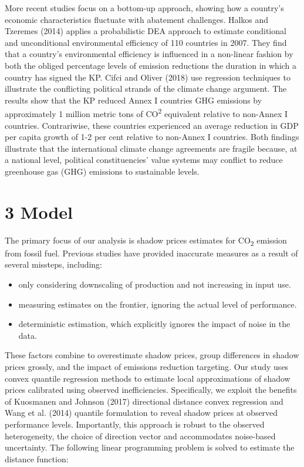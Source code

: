 \documentclass[
  10pt,
]{article}
\providecommand{\tightlist}{%
  \setlength{\itemsep}{0pt}\setlength{\parskip}{0pt}}
\begin{document}
More recent studies focus on a bottom-up approach, showing how a
country's economic characteristics fluctuate with abatement challenges.
Halkos and Tzeremes (2014) applies a probabilistic DEA approach to
estimate conditional and unconditional environmental efficiency of 110
countries in 2007. They find that a country's environmental efficiency
is influenced in a non-linear fashion by both the obliged percentage
levels of emission reductions the duration in which a country has signed
the KP. Cifci and Oliver (2018) use regression techniques to illustrate
the conflicting political strands of the climate change argument. The
results show that the KP reduced Annex I countries GHG emissions by
approximately 1 million metric tons of CO\textsuperscript{2} equivalent
relative to non-Annex I countries. Contrariwise, these countries
experienced an average reduction in GDP per capita growth of 1-2 per
cent relative to non-Annex I countries. Both findings illustrate that
the international climate change agreements are fragile because, at a
national level, political constituencies' value systems may conflict to
reduce greenhouse gas (GHG) emissions to sustainable levels.

\hypertarget{model}{%
\section{3 Model}\label{model}}

The primary focus of our analysis is shadow prices estimates for
CO\textsubscript{2} emission from fossil fuel. Previous studies have
provided inaccurate measures as a result of several missteps, including:

\begin{itemize}
\tightlist
\item
  only considering downscaling of production and not increasing in input
  use.
\item
  measuring estimates on the frontier, ignoring the actual level of
  performance.
\item
  deterministic estimation, which explicitly ignores the impact of noise
  in the data.
\end{itemize}

These factors combine to overestimate shadow prices, group differences
in shadow prices grossly, and the impact of emissions reduction
targeting. Our study uses convex quantile regression methods to estimate
local approximations of shadow prices calibrated using observed
inefficiencies. Specifically, we exploit the benefits of Kuosmanen and
Johnson (2017) directional distance convex regression and Wang et al.
(2014) quantile formulation to reveal shadow prices at observed
performance levels. Importantly, this approach is robust to the observed
heterogeneity, the choice of direction vector and accommodates
noise-based uncertainty. The following linear programming problem is
solved to estimate the distance function:
\end{document}
